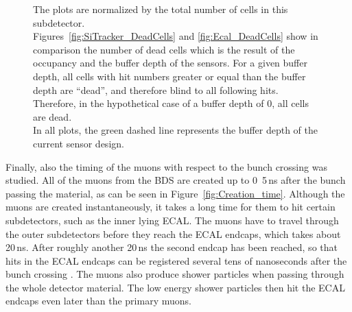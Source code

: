 \begin{figure}
{    The plots are normalized by the total number of cells in this subdetector.\\
    Figures~\ref{fig:SiTracker_DeadCells} and \ref{fig:Ecal_DeadCells} show in comparison the number of dead cells which is the result of the occupancy and the buffer depth of the sensors.
    For a given buffer depth, all cells with hit numbers greater or equal than the buffer depth are ``dead'', and therefore blind to all following hits.
    Therefore, in the hypothetical case of a buffer depth of 0, all cells are dead.\\
    In all plots, the green dashed line represents the buffer depth of the current sensor design.
    }
    \label{fig:Occupancy_DeadCells}
\end{figure}

Finally, also the timing of the muons with respect to the bunch crossing was studied.
All of the muons from the BDS are created up to \unit{0.5}\,{ns} after the bunch passing the material, as can be seen in Figure~\ref{fig:Creation_time}.
Although the muons are created instantaneously, it takes a long time for them to hit certain subdetectors, such as the inner lying ECAL.
The muons have to travel through the outer subdetectors before they reach the ECAL endcaps, which takes about \unit{20}\,{ns}.
After roughly another \unit{20}\,{ns} the second endcap has been reached, so that hits in the ECAL endcaps can be registered several tens of nanoseconds after the bunch crossing .
The muons also produce shower particles when passing through the whole detector material.
The low energy shower particles then hit the ECAL endcaps even later than the primary muons.


